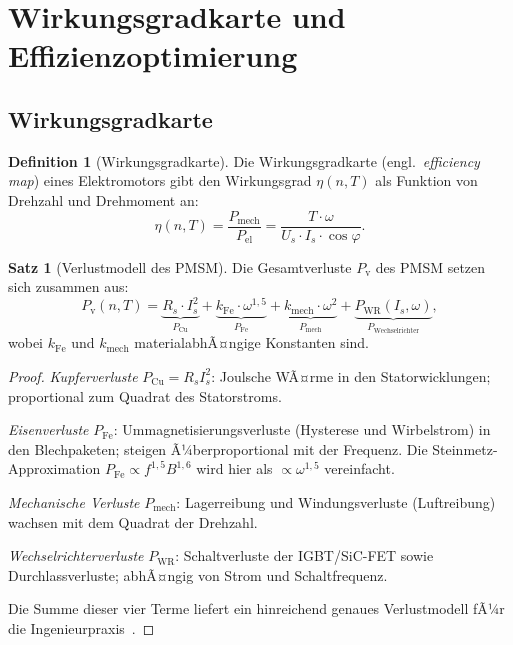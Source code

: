 ﻿\documentclass[a4paper,12pt]{article}
\theoremstyle{definition}
\newtheorem{definition}{Definition}
\newtheorem{satz}{Satz}
\begin{document}
\section{Wirkungsgradkarte und Effizienzoptimierung}
\label{sec:effizienz}

\subsection{Wirkungsgradkarte}

\begin{definition}[Wirkungsgradkarte]
    Die Wirkungsgradkarte (engl.\ \emph{efficiency map}) eines Elektromotors gibt
    den Wirkungsgrad $\eta(n, T)$ als Funktion von Drehzahl und Drehmoment an:
    \[
        \eta(n, T) = \frac{P_{\mathrm{mech}}}{P_{\mathrm{el}}}
                   = \frac{T \cdot \omega}{U_s \cdot I_s \cdot \cos\varphi}.
    \]
\end{definition}

\begin{satz}[Verlustmodell des PMSM]
\label{satz:verluste}
    Die Gesamtverluste $P_{\mathrm{v}}$ des PMSM setzen sich zusammen aus:
    \[
        P_{\mathrm{v}}(n, T) = \underbrace{R_s \cdot I_s^2}_{P_{\mathrm{Cu}}}
        + \underbrace{k_{\mathrm{Fe}} \cdot \omega^{1{,}5}}_{P_{\mathrm{Fe}}}
        + \underbrace{k_{\mathrm{mech}} \cdot \omega^2}_{P_{\mathrm{mech}}}
        + \underbrace{P_{\mathrm{WR}}(I_s, \omega)}_{P_{\mathrm{Wechselrichter}}},
    \]
    wobei $k_{\mathrm{Fe}}$ und $k_{\mathrm{mech}}$ materialabhÃ¤ngige Konstanten sind.
\end{satz}

\begin{proof}
    \textit{Kupferverluste} $P_{\mathrm{Cu}} = R_s I_s^2$: Joulsche WÃ¤rme in den
    Statorwicklungen; proportional zum Quadrat des Statorstroms.

    \textit{Eisenverluste} $P_{\mathrm{Fe}}$: Ummagnetisierungsverluste (Hysterese
    und Wirbelstrom) in den Blechpaketen; steigen Ã¼berproportional mit der Frequenz.
    Die Steinmetz-Approximation $P_{\mathrm{Fe}} \propto f^{1{,}5} B^{1{,}6}$ wird
    hier als $\propto \omega^{1{,}5}$ vereinfacht.

    \textit{Mechanische Verluste} $P_{\mathrm{mech}}$: Lagerreibung und
    Windungsverluste (Luftreibung) wachsen mit dem Quadrat der Drehzahl.

    \textit{Wechselrichterverluste} $P_{\mathrm{WR}}$: Schaltverluste der IGBT/SiC-FET
    sowie Durchlassverluste; abhÃ¤ngig von Strom und Schaltfrequenz.

    Die Summe dieser vier Terme liefert ein hinreichend genaues Verlustmodell fÃ¼r die
    Ingenieurpraxis~\cite{mohan2003electric}.
\end{proof}
\end{document}

